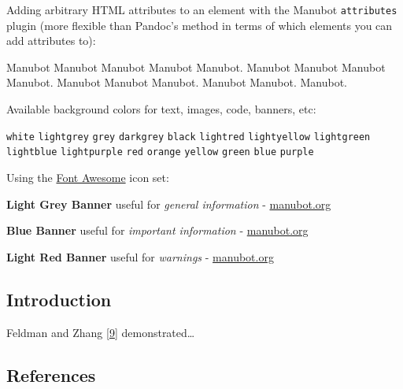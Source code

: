 Adding arbitrary HTML attributes to an element with the Manubot \texttt{attributes} plugin (more flexible than Pandoc's method in terms of which elements you can add attributes to):

Manubot Manubot Manubot Manubot Manubot.
Manubot Manubot Manubot Manubot.
Manubot Manubot Manubot.
Manubot Manubot.
Manubot.

Available background colors for text, images, code, banners, etc:

\texttt{white}
\texttt{lightgrey}
\texttt{grey}
\texttt{darkgrey}
\texttt{black}
\texttt{lightred}
\texttt{lightyellow}
\texttt{lightgreen}
\texttt{lightblue}
\texttt{lightpurple}
\texttt{red}
\texttt{orange}
\texttt{yellow}
\texttt{green}
\texttt{blue}
\texttt{purple}

Using the \href{https://fontawesome.com/}{Font Awesome} icon set:

{ \textbf{Light Grey Banner}
useful for \emph{general information} - \href{https://manubot.org/}{manubot.org}}

{ \textbf{Blue Banner}
useful for \emph{important information} - \href{https://manubot.org/}{manubot.org}}

{ \textbf{Light Red Banner}
useful for \emph{warnings} - \href{https://manubot.org/}{manubot.org}}

\hypertarget{introduction}{%
\subsection{Introduction}\label{introduction}}

Feldman and Zhang {[}\protect\hyperlink{ref-Y4JFfN9O}{9}{]} demonstrated\ldots{}

\hypertarget{references}{%
\subsection{References}\label{references}}

